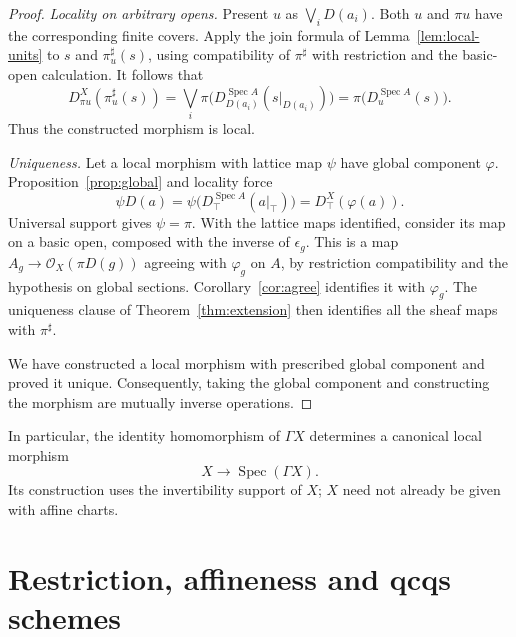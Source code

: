 \documentclass[11pt]{amsart}
\theoremstyle{definition}
\theoremstyle{remark}
\newcommand{\Spec}{\operatorname{Spec}}
\newcommand{\OO}{\mathcal O}
\newcommand{\restr}[2]{#1|_{#2}}
\begin{document}
\begin{proof}
\emph{Locality on arbitrary opens.} Present $u$ as
$\bigvee_iD(a_i)$. Both $u$ and $\pi u$ have the corresponding finite
covers. Apply the join formula of Lemma~\ref{lem:local-units} to $s$
and $\pi^\sharp_u(s)$, using compatibility of $\pi^\sharp$ with
restriction and the basic-open calculation. It follows that
\[
 D^X_{\pi u}(\pi^\sharp_u(s))
 =\bigvee_i\pi\bigl(D^{\Spec A}_{D(a_i)}(\restr{s}{D(a_i)})\bigr)
 =\pi\bigl(D^{\Spec A}_u(s)\bigr).
\]
Thus the constructed morphism is local.

\emph{Uniqueness.} Let a local morphism with lattice map $\psi$ have
global component $\varphi$. Proposition~\ref{prop:global} and locality
force
\[
 \psi D(a)
 =\psi\bigl(D^{\Spec A}_\top(a|_\top)\bigr)
 =D^X_\top(\varphi(a)).
\]
Universal support gives $\psi=\pi$. With the lattice maps identified,
consider its map on a basic open, composed with the inverse of
$\epsilon_g$. This is a map $A_g\to\OO_X(\pi D(g))$ agreeing with
$\varphi_g$ on $A$, by restriction compatibility and the hypothesis on
global sections. Corollary~\ref{cor:agree} identifies it with
$\varphi_g$. The uniqueness clause of
Theorem~\ref{thm:extension} then identifies all the sheaf maps with
$\pi^\sharp$.

We have constructed a local morphism with prescribed global component
and proved it unique. Consequently, taking the global component and
constructing the morphism are mutually inverse operations.
\end{proof}

In particular, the identity homomorphism of $\Gamma X$ determines a
canonical local morphism
\[
 X\longrightarrow\Spec(\Gamma X).
\]
Its construction uses the invertibility support of $X$; $X$ need not
already be given with affine charts.

\section{Restriction, affineness and qcqs schemes}
\end{document}
